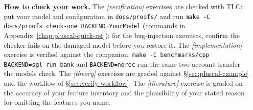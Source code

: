 \textbf{How to check your work.} The \emph{[verification]} exercises are
checked with TLC: put your model and configuration in
\texttt{docs/proofs/} and run
\texttt{make -C docs/proofs check-one BACKEND=YourModel} (commands in
Appendix~\ref{chap:pluscal-quick-ref}); for the bug-injection exercises,
confirm the checker fails on the damaged model before you restore it.  The
\emph{[implementation]} exercise is verified against the companion:
\texttt{make -C benchmarks/cpp BACKEND=sgl run-bank} and
\texttt{BACKEND=norec} run the same two-account transfer the models check.
The \emph{[theory]} exercises are graded against
\S\ref{sec:pluscal-example} and the workflow of \S\ref{sec:verify-workflow}.
The \emph{[literature]} exercise is graded on the accuracy of your feature
inventory and the plausibility of your stated reason for omitting the
features you name.

